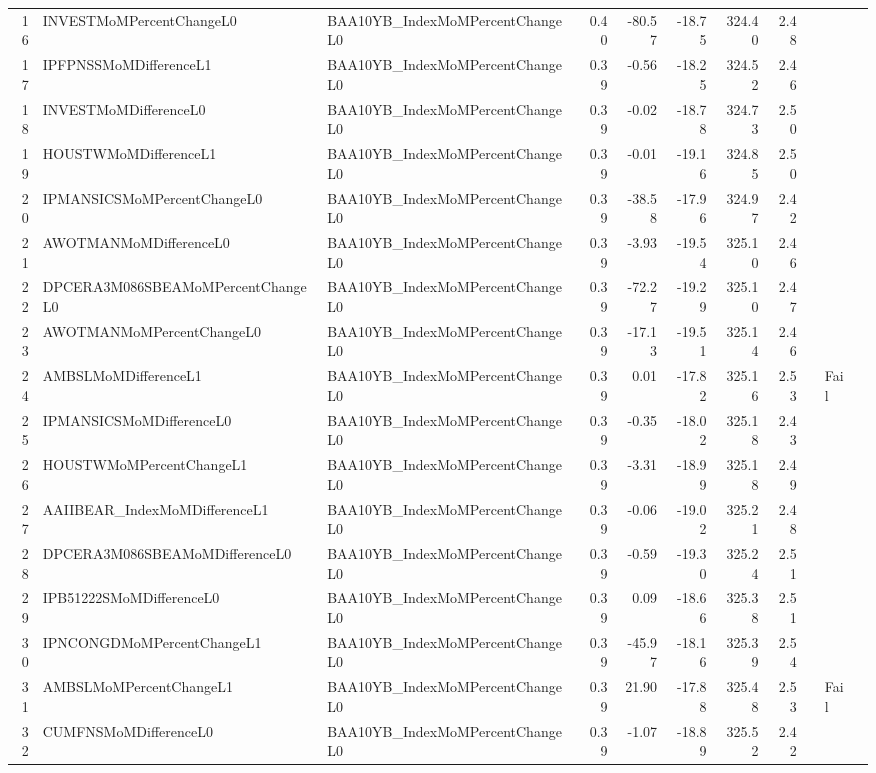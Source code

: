 \begin{longtable}{rllrrrrrlll}
  16 & INVESTMoMPercentChangeL0 & BAA10YB\_IndexMoMPercentChangeL0 & 0.40 & -80.57 & -18.75 & 324.40 & 2.48 &  &  &  \\ 
  17 & IPFPNSSMoMDifferenceL1 & BAA10YB\_IndexMoMPercentChangeL0 & 0.39 & -0.56 & -18.25 & 324.52 & 2.46 &  &  &  \\ 
  18 & INVESTMoMDifferenceL0 & BAA10YB\_IndexMoMPercentChangeL0 & 0.39 & -0.02 & -18.78 & 324.73 & 2.50 &  &  &  \\ 
  19 & HOUSTWMoMDifferenceL1 & BAA10YB\_IndexMoMPercentChangeL0 & 0.39 & -0.01 & -19.16 & 324.85 & 2.50 &  &  &  \\ 
  20 & IPMANSICSMoMPercentChangeL0 & BAA10YB\_IndexMoMPercentChangeL0 & 0.39 & -38.58 & -17.96 & 324.97 & 2.42 &  &  &  \\ 
  21 & AWOTMANMoMDifferenceL0 & BAA10YB\_IndexMoMPercentChangeL0 & 0.39 & -3.93 & -19.54 & 325.10 & 2.46 &  &  &  \\ 
  22 & DPCERA3M086SBEAMoMPercentChangeL0 & BAA10YB\_IndexMoMPercentChangeL0 & 0.39 & -72.27 & -19.29 & 325.10 & 2.47 &  &  &  \\ 
  23 & AWOTMANMoMPercentChangeL0 & BAA10YB\_IndexMoMPercentChangeL0 & 0.39 & -17.13 & -19.51 & 325.14 & 2.46 &  &  &  \\ 
  24 & AMBSLMoMDifferenceL1 & BAA10YB\_IndexMoMPercentChangeL0 & 0.39 & 0.01 & -17.82 & 325.16 & 2.53 &  & Fail &  \\ 
  25 & IPMANSICSMoMDifferenceL0 & BAA10YB\_IndexMoMPercentChangeL0 & 0.39 & -0.35 & -18.02 & 325.18 & 2.43 &  &  &  \\ 
  26 & HOUSTWMoMPercentChangeL1 & BAA10YB\_IndexMoMPercentChangeL0 & 0.39 & -3.31 & -18.99 & 325.18 & 2.49 &  &  &  \\ 
  27 & AAIIBEAR\_IndexMoMDifferenceL1 & BAA10YB\_IndexMoMPercentChangeL0 & 0.39 & -0.06 & -19.02 & 325.21 & 2.48 &  &  &  \\ 
  28 & DPCERA3M086SBEAMoMDifferenceL0 & BAA10YB\_IndexMoMPercentChangeL0 & 0.39 & -0.59 & -19.30 & 325.24 & 2.51 &  &  &  \\ 
  29 & IPB51222SMoMDifferenceL0 & BAA10YB\_IndexMoMPercentChangeL0 & 0.39 & 0.09 & -18.66 & 325.38 & 2.51 &  &  &  \\ 
  30 & IPNCONGDMoMPercentChangeL1 & BAA10YB\_IndexMoMPercentChangeL0 & 0.39 & -45.97 & -18.16 & 325.39 & 2.54 &  &  &  \\ 
  31 & AMBSLMoMPercentChangeL1 & BAA10YB\_IndexMoMPercentChangeL0 & 0.39 & 21.90 & -17.88 & 325.48 & 2.53 &  & Fail &  \\ 
  32 & CUMFNSMoMDifferenceL0 & BAA10YB\_IndexMoMPercentChangeL0 & 0.39 & -1.07 & -18.89 & 325.52 & 2.42 &  &  &  \\ 

\end{longtable}
